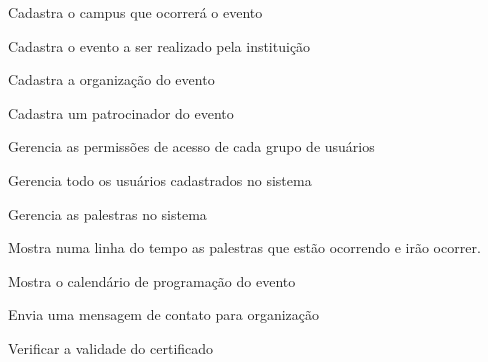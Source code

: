 \documentclass[12pt,a4paper]{article}
\begin{document}
			
        	{Cadastra o campus que ocorrerá o evento}
        	{%
        	
        	}
			
        	{Cadastra o evento a ser realizado pela instituição }
        	{%
        	
        	}
			
        	{Cadastra a organização do evento}
        	{%
        	
        	}
			
        	{Cadastra um patrocinador do evento}
        	{%
        	
        	}
			
        	{}
        	{%
        	
        	}
			
        	{Gerencia as permissões de acesso de cada grupo de usuários}
        	{%
        	
        	}
			
        	{Gerencia todo os usuários cadastrados no sistema}
        	{%
        	
        	}
			
        	{Gerencia as palestras no sistema}
        	{%
        	
        	}
			
        	{Mostra numa linha do tempo as palestras que estão ocorrendo e irão ocorrer.}
        	{%
        	
        	}
			
        	{Mostra o calendário de programação do evento}
        	{%
        	
        	}
			
        	{Envia uma mensagem de contato para organização}
        	{%
        	
        	}
			
        	{Verificar a validade do certificado}
        	{%
        	
        	}
			
\end{document}
